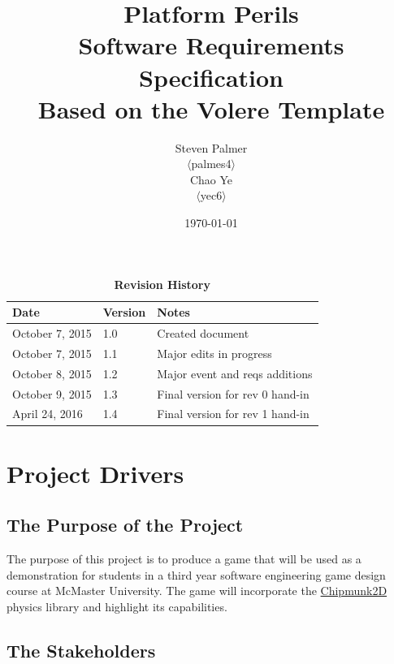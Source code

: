 \documentclass[12pt, titlepage]{article}
\begin{document}
\title{\bf Platform Perils\\[\baselineskip]\Large Software Requirements Specification\\[2\baselineskip] \large Based on the Volere Template}
\author{Steven Palmer\\$\langle$palmes4$\rangle$\\Chao Ye\\$\langle$yec6$\rangle$}
\date{\today}
	
\maketitle

\tableofcontents
\listoftables
\listoffigures

\begin{table}[bp]
\caption*{\bf Revision History}
\begin{tabularx}{\textwidth}{p{3cm}p{2cm}X}
\toprule {\bf Date} & {\bf Version} & {\bf Notes}\\
\midrule
October 7, 2015 & 1.0 & Created document\\
October 7, 2015 & 1.1 & Major edits in progress\\
October 8, 2015 & 1.2 & Major event and reqs additions\\
October 9, 2015 & 1.3 & Final version for rev 0 hand-in\\
April 24, 2016 & 1.4 & Final version for rev 1 hand-in\\
\bottomrule
\end{tabularx}
\end{table}

\newpage

\section{Project Drivers}
\subsection{The Purpose of the Project}
The purpose of this project is to produce a game that will be used as a demonstration for students in a third year software engineering game design course at McMaster University.  The game will incorporate the \href{https://chipmunk-physics.net/}{Chipmunk2D} physics library and highlight its capabilities.
\subsection{The Stakeholders}
\end{document}
